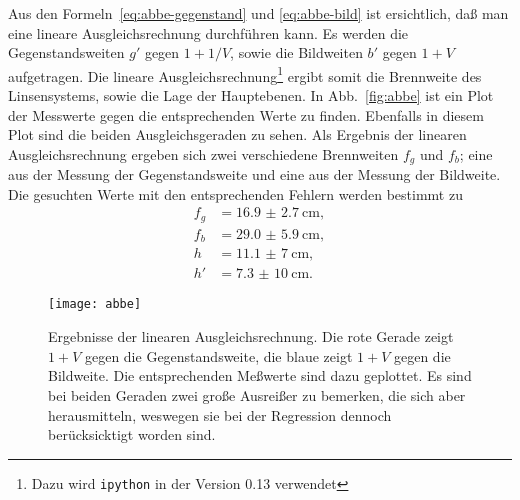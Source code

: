Aus den Formeln~\eqref{eq:abbe-gegenstand} und \eqref{eq:abbe-bild} ist
ersichtlich, daß man eine lineare Ausgleichsrechnung durchführen
kann. Es werden die Gegenstandsweiten $g'$ gegen $1 + 1/V$, sowie die
Bildweiten $b'$ gegen $1 + V$ aufgetragen. Die lineare
Ausgleichsrechnung\footnote{Dazu wird \texttt{ipython} in der Version
  0.13 verwendet} ergibt somit die Brennweite des Linsensystems, sowie
die Lage der Hauptebenen.  In Abb.~\vref{fig:abbe} ist ein Plot der
Messwerte gegen die entsprechenden Werte zu finden. Ebenfalls in diesem
Plot sind die beiden Ausgleichsgeraden zu sehen.  Als Ergebnis der
linearen Ausgleichsrechnung ergeben sich zwei verschiedene Brennweiten
$f_g$ und $f_b$; eine aus der Messung der Gegenstandsweite und eine aus
der Messung der Bildweite.  Die gesuchten Werte mit den entsprechenden
Fehlern werden bestimmt zu
\begin{align*}
f_g &= \SI{16.9(27)}{\centi\metre}, \\
f_b &= \SI{29.0(59)}{\centi\metre}, \\
h   &= \SI{11.1(70)}{\centi\metre}, \\
h'  &= \SI{7.3(100)}{\centi\metre}.
\end{align*}

\begin{figure}
  \centering
  \texttt{[image: abbe]}
  \caption{Ergebnisse der linearen Ausgleichsrechnung. Die rote Gerade
    zeigt $1 + V$ gegen die Gegenstandsweite, die blaue zeigt $1 + V$
    gegen die Bildweite. Die entsprechenden Meßwerte sind dazu
    geplottet. Es sind bei beiden Geraden zwei große Ausreißer zu
    bemerken, die sich aber herausmitteln, weswegen sie bei der
    Regression dennoch berücksicktigt worden sind.}
  \label{fig:abbe}
\end{figure}